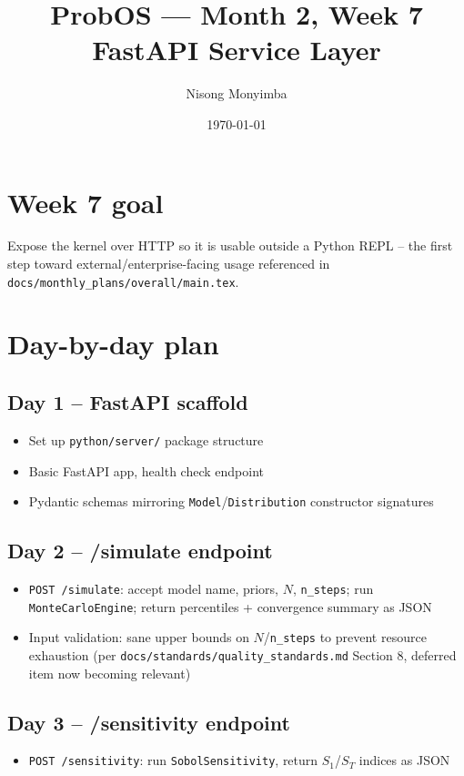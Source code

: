 \documentclass[11pt]{article}
\title{ProbOS --- Month 2, Week 7\\FastAPI Service Layer}
\author{Nisong Monyimba}
\date{\today}
\begin{document}
\maketitle

\section*{Week 7 goal}
Expose the kernel over HTTP so it is usable outside a Python REPL --
the first step toward external/enterprise-facing usage referenced in
\texttt{docs/monthly\_plans/overall/main.tex}.

\section*{Day-by-day plan}

\subsection*{Day 1 -- FastAPI scaffold}
\begin{itemize}[leftmargin=*]
  \item Set up \texttt{python/server/} package structure
  \item Basic FastAPI app, health check endpoint
  \item Pydantic schemas mirroring \texttt{Model}/\texttt{Distribution}
    constructor signatures
\end{itemize}

\subsection*{Day 2 -- /simulate endpoint}
\begin{itemize}[leftmargin=*]
  \item \texttt{POST /simulate}: accept model name, priors, $N$,
    \texttt{n\_steps}; run \texttt{MonteCarloEngine}; return
    percentiles + convergence summary as JSON
  \item Input validation: sane upper bounds on $N$/\texttt{n\_steps} to
    prevent resource exhaustion (per
    \texttt{docs/standards/quality\_standards.md} Section 8, deferred
    item now becoming relevant)
\end{itemize}

\subsection*{Day 3 -- /sensitivity endpoint}
\begin{itemize}[leftmargin=*]
  \item \texttt{POST /sensitivity}: run \texttt{SobolSensitivity},
    return $S_1$/$S_T$ indices as JSON
\end{itemize}
\end{document}
